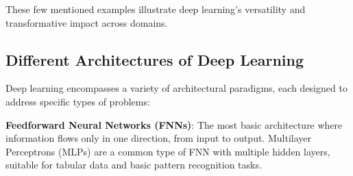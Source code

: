

These few mentioned examples illustrate deep learning's versatility and transformative impact across domains.

\subsection{Different Architectures of Deep Learning}
\label{sec:dl_architectures}
Deep learning encompasses a variety of architectural paradigms, each designed to address specific types of problems:

\textbf{Feedforward Neural Networks (FNNs)}:
The most basic architecture where information flows only in one direction, from input to output. Multilayer Perceptrons (MLPs) are a common type of FNN with multiple hidden layers, suitable for tabular data and basic pattern recognition tasks.

